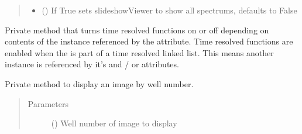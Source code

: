 \documentclass[letterpaper,10pt,english]{sphinxmanual}
\begin{document}
\begin{fulllineitems}
\begin{fulllineitems}
\begin{quote}
\begin{description}
\begin{itemize}
\item {} 
 (\sphinxstyleliteralemphasis{\sphinxupquote{, }}) \textendash{} If True sets slideshowViewer to show all
spectrums, defaults to False

\end{itemize}

\end{description}\end{quote}

\end{fulllineitems}


\begin{fulllineitems}
\label{\detokenize{polo.widgets:polo.widgets.slideshow_inspector.slideshowInspector._set_time_resolved_functions}}
Private method that turns time resolved functions on or off 
depending on contents of the  instance referenced by 
the  attribute. Time resolved functions are enabled 
when the  is part of a time resolved linked list. 
This means another  instance is referenced by 
it’s  and / or  attributes.

\end{fulllineitems}


\begin{fulllineitems}
\label{\detokenize{polo.widgets:polo.widgets.slideshow_inspector.slideshowInspector._show_image_from_well_number}}
Private method to display an image by well number.
\begin{quote}\begin{description}
\item[{Parameters}] \leavevmode
{} () \textendash{} Well number of image to display


\end{description}
\end{quote}
\end{fulllineitems}
\end{fulllineitems}
\end{document}
